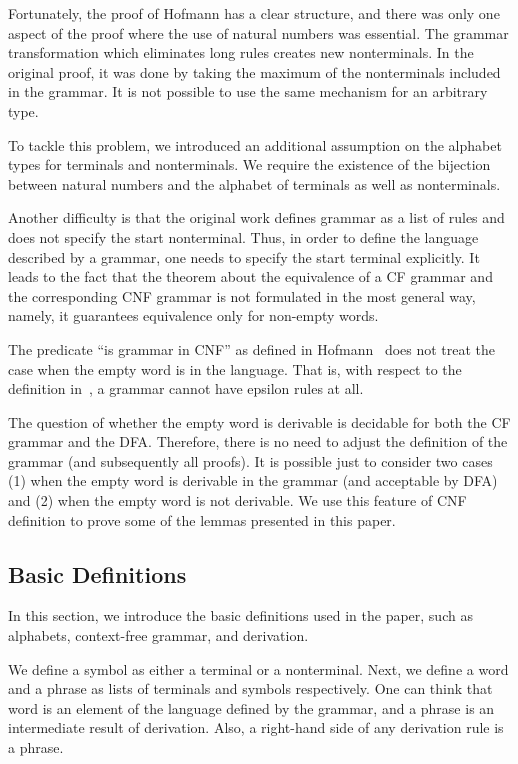 \documentclass[runningheads]{llncs}
\begin{document}
Fortunately, the proof of Hofmann has a clear structure, and there was only one aspect of the proof where the use of natural numbers was essential. The grammar transformation which eliminates long rules creates new nonterminals. In the original proof, it was done by taking the maximum of the nonterminals included in the grammar.
It is not possible to use the same mechanism for an arbitrary type.

To tackle this problem, we introduced an additional assumption on the alphabet types for terminals and nonterminals. We require the existence of the bijection between natural numbers and the alphabet of terminals as well as nonterminals.

Another difficulty is that the original work defines grammar as a list of rules and does not specify the start nonterminal. Thus, in order to define the language described by a  grammar, one needs to specify the start terminal explicitly. It leads to the fact that the theorem about the equivalence of a CF grammar and the corresponding CNF grammar is not formulated in the most general way, namely, it guarantees equivalence only for non-empty words.

The predicate ``is grammar in CNF'' as defined in Hofmann~\cite{smolkaHofmann2016} does not treat the case when the empty word is in the language. That is, with respect to the definition in~\cite{smolkaHofmann2016}, a grammar cannot have epsilon rules at all.

The question of whether the empty word is derivable is decidable for both the CF grammar and the DFA. Therefore, there is no need to adjust the definition of the grammar (and subsequently all proofs). It is possible just to consider two cases (1) when the empty word is derivable in the grammar (and acceptable by DFA) and (2) when the empty word is not derivable. We use this feature of CNF definition to prove some of the lemmas presented in this paper.

\subsection{Basic Definitions}

In this section, we introduce the basic definitions used in the paper, such as alphabets, context-free grammar, and derivation.

We define a symbol as either a terminal or a nonterminal.
Next, we define a word and a phrase as lists of terminals and symbols respectively.
One can think that word is an element of the language defined by the grammar, and a phrase is an intermediate result of derivation.
Also, a right-hand side of any derivation rule is a phrase.
\end{document}
